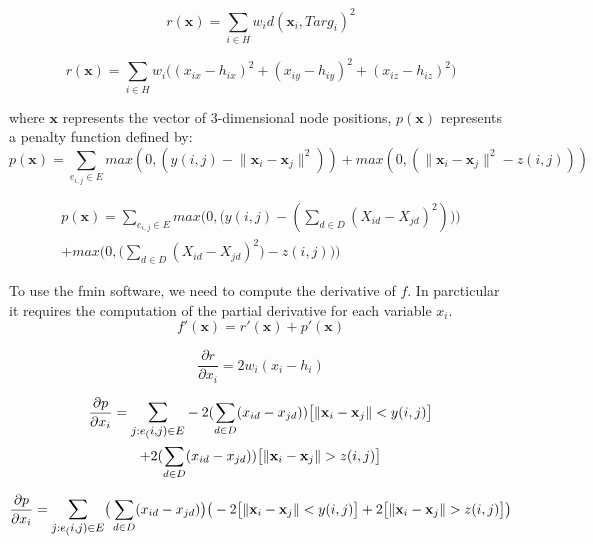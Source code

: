 \documentclass[11pt]{article}
\begin{document}
\begin{equation}
  r(\mathbf{x}) = \sum_{i \in H} w_id(\mathbf{x}_i,Targ_i)^2 
\end{equation}

\begin{equation}
  r(\mathbf{x}) = \sum_{i \in H} w_i\big((x_{ix} - h_{ix})^2 + (x_{iy} - h_{iy})^2 + (x_{iz} - h_{iz})^2\big)
\end{equation}

where $\mathbf{x}$ represents the vector of 3-dimensional node positions, $p(\mathbf{x})$
represents a penalty function defined by:
\begin{equation}
  p(\mathbf{x}) = \sum_{e_{i,j} \in E} max(0, (y(i,j) - \lVert \mathbf{x}_i - \mathbf{x}_j \rVert^2  ))
  + max(0,  (\lVert \mathbf{x}_i - \mathbf{x}_j \rVert^2 - z(i,j) ))
\end{equation}


\begin{multline}
  p(\mathbf{x}) = \sum_{e_{i,j} \in E} max \bigg(0, \Big(y(i,j) - ( \sum_{d \in D}(X_{id} - X_{jd})^2 )  \Big) \bigg) \\
  + max \bigg(0,  \Big(\sum_{d \in D}(X_{id} - X_{jd})^2) - z(i,j) \Big) \bigg)
\end{multline}

To use the fmin software, we need to compute the derivative of $f$. In parcticular
it requires the computation of the partial derivative for each variable $x_i$.
\begin{equation}
  f'(\mathbf{x}) = r'(\mathbf{x}) + p'(\mathbf{x})
\end{equation}

\begin{equation}
  \frac{\partial r}{\partial x_i}  =  2w_i(x_i - h_i)
\end{equation}

\begin{multline}
  \frac{\partial p}{\partial x_i}
  =  \mathlarger{\sum_{j:e_(i,j) \in E}}
  -2(\sum_{d \in D}(x_{id} - x_{jd}))\big[\lVert \mathbf{x}_i - \mathbf{x}_j \rVert < y(i,j)\big]\\
  + 2(\sum_{d \in D}(x_{id} - x_{jd}))\big[\lVert \mathbf{x}_i - \mathbf{x}_j \rVert > z(i,j)\big]
\end{multline}

\begin{multline}
  \frac{\partial p}{\partial x_i}
  =  \mathlarger{\sum_{j:e_(i,j) \in E}}
  \big(\sum_{d \in D}(x_{id} - x_{jd})\big) \big(-2\big[\lVert \mathbf{x}_i - \mathbf{x}_j \rVert < y(i,j)\big]
  + 2\big[\lVert \mathbf{x}_i - \mathbf{x}_j \rVert > z(i,j)\big]\big)
\end{multline}
\end{document}
